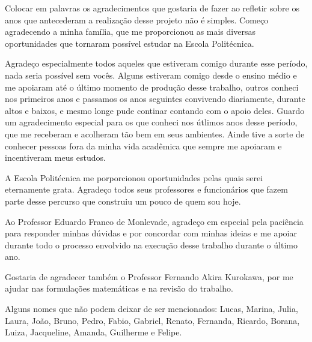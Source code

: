 Colocar em palavras os agradecimentos que gostaria de fazer ao refletir sobre os anos que antecederam a realização desse projeto não é simples. Começo agradecendo a minha família, que me proporcionou as mais diversas oportunidades que tornaram possível estudar na Escola Politécnica.

Agradeço especialmente todos aqueles que estiveram comigo durante esse período, nada seria possível sem vocês. Alguns estiveram comigo desde o ensino médio e me apoiaram até o último momento de produção desse trabalho, outros conheci nos primeiros anos e passamos os anos seguintes convivendo diariamente, durante altos e baixos, e mesmo longe pude continar contando com o apoio deles. Guardo um agradecimento especial para os que conheci nos útlimos anos desse período, que me receberam e acolheram tão bem em seus ambientes.
Ainde tive a sorte de conhecer pessoas fora da minha vida acadêmica que sempre me apoiaram e incentiveram meus estudos. 

A Escola Politécnica me porporcionou oportunidades pelas quais serei eternamente grata. Agradeço todos seus professores e funcionários que fazem parte desse percurso que construiu um pouco de quem sou hoje. 

Ao Professor Eduardo Franco de Monlevade, agradeço em especial pela paciência para responder minhas dúvidas e por concordar com minhas ideias e me apoiar durante todo o processo envolvido na execução desse trabalho durante o último ano.

Gostaria de agradecer também o Professor Fernando Akira Kurokawa, por me ajudar nas formulações matemáticas e na revisão do trabalho.

Alguns nomes que não podem deixar de ser mencionados: Lucas, Marina, Julia, Laura, João, Bruno, Pedro, Fabio, Gabriel, Renato, Fernanda, Ricardo, Borana, Luiza, Jacqueline, Amanda, Guilherme e Felipe.